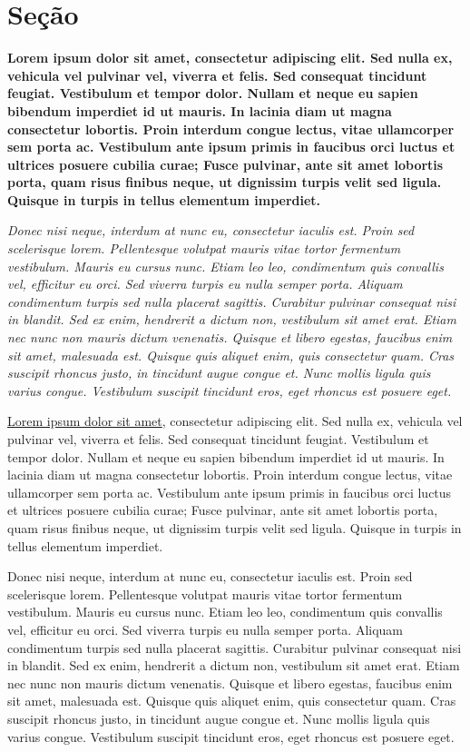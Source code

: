 \documentclass[12pt]{article}
\begin{document}
\section{Seção}
\textbf{
Lorem ipsum dolor sit amet, consectetur adipiscing elit. Sed nulla ex, vehicula vel pulvinar vel, viverra et felis. Sed consequat tincidunt feugiat. Vestibulum et tempor dolor. Nullam et neque eu sapien bibendum imperdiet id ut mauris. In lacinia diam ut magna consectetur lobortis. Proin interdum congue lectus, vitae ullamcorper sem porta ac. Vestibulum ante ipsum primis in faucibus orci luctus et ultrices posuere cubilia curae; Fusce pulvinar, ante sit amet lobortis porta, quam risus finibus neque, ut dignissim turpis velit sed ligula. Quisque in turpis in tellus elementum imperdiet.
}
\newline
\newline

\textit{
Donec nisi neque, interdum at nunc eu, consectetur iaculis est. Proin sed scelerisque lorem. Pellentesque volutpat mauris vitae tortor fermentum vestibulum. Mauris eu cursus nunc. Etiam leo leo, condimentum quis convallis vel, efficitur eu orci. Sed viverra turpis eu nulla semper porta. Aliquam condimentum turpis sed nulla placerat sagittis. Curabitur pulvinar consequat nisi in blandit. Sed ex enim, hendrerit a dictum non, vestibulum sit amet erat. Etiam nec nunc non mauris dictum venenatis. Quisque et libero egestas, faucibus enim sit amet, malesuada est. Quisque quis aliquet enim, quis consectetur quam. Cras suscipit rhoncus justo, in tincidunt augue congue et. Nunc mollis ligula quis varius congue. Vestibulum suscipit tincidunt eros, eget rhoncus est posuere eget.
}
\newline
\newline

\underline{Lorem ipsum dolor sit amet}, consectetur adipiscing elit. Sed nulla ex, vehicula vel pulvinar vel, viverra et felis. Sed consequat tincidunt feugiat. Vestibulum et tempor dolor. Nullam et neque eu sapien bibendum imperdiet id ut mauris. In lacinia diam ut magna consectetur lobortis. Proin interdum congue lectus, vitae ullamcorper sem porta ac. Vestibulum ante ipsum primis in faucibus orci luctus et ultrices posuere cubilia curae; Fusce pulvinar, ante sit amet lobortis porta, quam risus finibus neque, ut dignissim turpis velit sed ligula. Quisque in turpis in tellus elementum imperdiet.
\newline
\newline

Donec nisi neque, interdum at nunc eu, consectetur iaculis est. Proin sed scelerisque lorem. Pellentesque volutpat mauris vitae tortor fermentum vestibulum. Mauris eu cursus nunc. Etiam leo leo, condimentum quis convallis vel, efficitur eu orci. Sed viverra turpis eu nulla semper porta. Aliquam condimentum turpis sed nulla placerat sagittis. Curabitur pulvinar consequat nisi in blandit. Sed ex enim, hendrerit a dictum non, vestibulum sit amet erat. Etiam nec nunc non mauris dictum venenatis. Quisque et libero egestas, faucibus enim sit amet, malesuada est. Quisque quis aliquet enim, quis consectetur quam. Cras suscipit rhoncus justo, in tincidunt augue congue et. Nunc mollis ligula quis varius congue. Vestibulum suscipit tincidunt eros, eget rhoncus est posuere eget.
	
\end{document}
